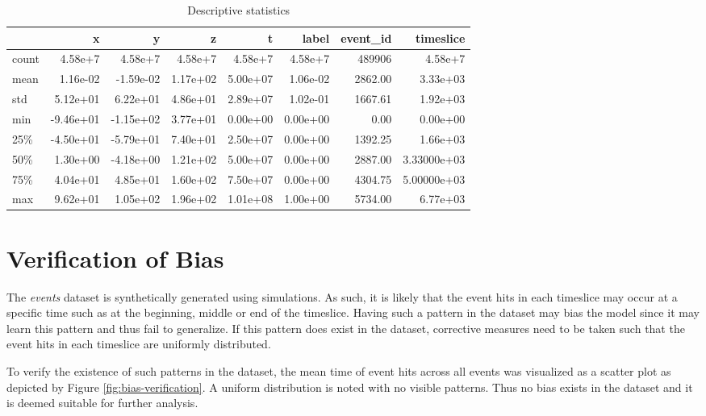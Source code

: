 \begin{table}[t]
  \centering
  \caption{Descriptive statistics}
  \label{tab:desc-stats}
  \begin{tabular}{lrrrrrrr}
    \hline
          & x & y & z & t & label & event\_id & timeslice \\
    \hline
    count & 4.58e+7 &  4.58e+7 &  4.58e+7 &  4.58e+7 &  4.58e+7 &  489906 &  4.58e+7 \\
    mean  & 1.16e-02 & -1.59e-02 &  1.17e+02 &  5.00e+07 &  1.06e-02 &    2862.00 &  3.33e+03 \\
    std   & 5.12e+01 &  6.22e+01 &  4.86e+01 &  2.89e+07 &  1.02e-01 &    1667.61 &  1.92e+03 \\
    min   & -9.46e+01 & -1.15e+02 &  3.77e+01 &  0.00e+00 &  0.00e+00 &       0.00 &  0.00e+00 \\
    25\%  & -4.50e+01 & -5.79e+01 &  7.40e+01 &  2.50e+07 &  0.00e+00 &    1392.25 &  1.66e+03 \\
    50\%  & 1.30e+00 & -4.18e+00 &  1.21e+02 &  5.00e+07 &  0.00e+00 &    2887.00 &  3.33000e+03 \\
    75\%  & 4.04e+01 &  4.85e+01 &  1.60e+02 &  7.50e+07 &  0.00e+00 &    4304.75 &  5.00000e+03 \\
    max  & 9.62e+01 &  1.05e+02 &  1.96e+02 &  1.01e+08 &  1.00e+00 &    5734.00 &  6.77e+03 \\
    \hline
  \end{tabular}
\end{table}

\section{Verification of Bias}%
\label{sec:data-exp-verification-bias}

The \emph{events} dataset is synthetically generated using simulations. As such,
it is likely that the event hits in each timeslice may occur at a specific
time such as at the beginning, middle or end of the timeslice. Having such
a pattern in the dataset may bias the model since it may learn this pattern and
thus fail to generalize. If this pattern does exist in the dataset, corrective
measures need to be taken such that the event hits in each timeslice are
uniformly distributed.

To verify the existence of such patterns in the dataset, the mean time
of event hits across all events was visualized as a scatter plot as
depicted by Figure \ref{fig:bias-verification}. A uniform distribution
is noted with no visible patterns. Thus no bias exists in the dataset
and it is deemed suitable for further analysis.

